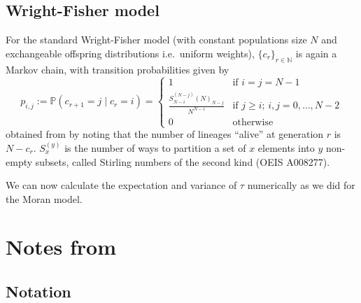 \documentclass{article}
\newcommand{\PR}{\mathbb{P}}
\begin{document}
\subsection*{Wright-Fisher model}
For the standard Wright-Fisher model (with constant populations size $N$ and exchangeable offspring distributions i.e.\ uniform weights), $\{c_r\}_{r\in\mathbb{N}}$ is again a Markov chain, with transition probabilities given by
\begin{equation}\label{eq:WF_coal_transprob}
p_{i,j} := \PR(c_{r+1} = j \mid c_r =i) = 
\begin{cases}
  1 &\text{if } i=j=N-1 \\
  \frac{S_{N-i}^{(N-j)} (N)_{N-j}}{N^{N-i}} &\text{if } j\geq i;\, i,j=0,\dots,N-2 \\
  0 &\text{otherwise}
\end{cases}
\end{equation}
obtained from \citet[equation 3.12]{wakeley2009} by noting that the number of lineages ``alive'' at generation $r$ is $N-c_r$.
$S_x^{(y)}$ is the number of ways to partition a set of $x$ elements into $y$ non-empty subsets, called Stirling numbers of the second kind (OEIS A008277).

We can now calculate the expectation and variance of $\tau$ numerically as we did for the Moran model.

\section*{Notes from \citet{koskela2018}}
\subsection*{Notation}

\subsection*{}




\end{document}
